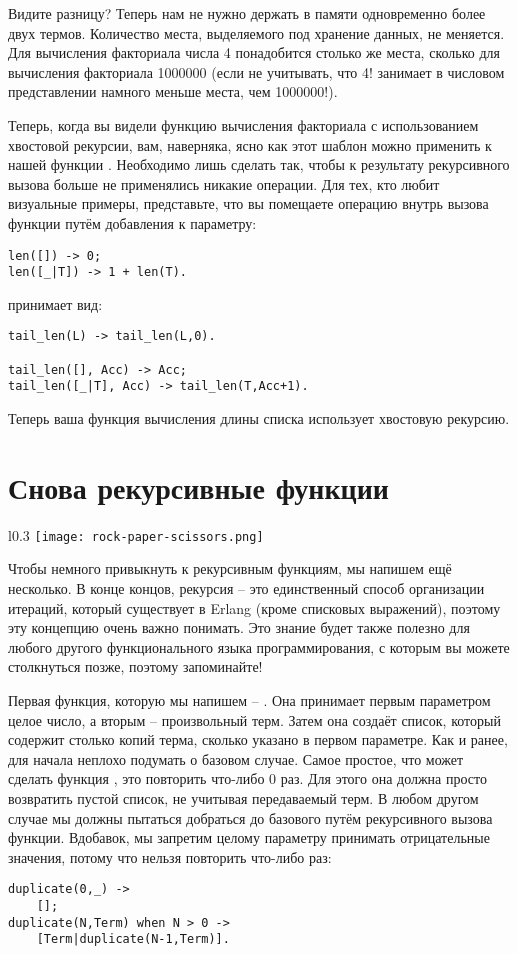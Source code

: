 Видите разницу? Теперь нам не нужно держать в памяти одновременно более двух термов. Количество места, выделяемого под хранение данных, не меняется. Для вычисления факториала числа 4 понадобится столько же места, сколько для вычисления факториала 1000000 (если не учитывать, что 4! занимает в числовом представлении намного меньше места, чем 1000000!).

Теперь, когда вы видели функцию вычисления факториала с использованием хвостовой рекурсии, вам, наверняка, ясно как этот шаблон можно применить к нашей функции . Необходимо лишь сделать так, чтобы к результату рекурсивного вызова больше не применялись никакие операции. Для тех, кто любит визуальные примеры, представьте, что вы помещаете операцию  внутрь вызова функции путём добавления к параметру:
\begin{lstlisting}[style=erlang]
len([]) -> 0;
len([_|T]) -> 1 + len(T).
\end{lstlisting}
принимает вид:
\begin{lstlisting}[style=erlang]
tail_len(L) -> tail_len(L,0).
 
tail_len([], Acc) -> Acc;
tail_len([_|T], Acc) -> tail_len(T,Acc+1).
\end{lstlisting}

Теперь ваша функция вычисления длины списка использует хвостовую рекурсию.
\section{Снова рекурсивные функции}
\begin{wrapfigure}{l}{0.3\linewidth}
    \texttt{[image: rock-paper-scissors.png]}
\end{wrapfigure}
Чтобы немного привыкнуть к рекурсивным функциям, мы напишем ещё несколько. В конце концов, рекурсия \--- это единственный способ организации итераций, который существует в Erlang (кроме списковых выражений), поэтому эту концепцию очень важно понимать. Это знание будет также полезно для любого другого функционального языка программирования, с которым вы можете столкнуться позже, поэтому запоминайте!

Первая функция, которую мы напишем \--- . Она принимает первым параметром целое число, а вторым \--- произвольный терм. Затем она создаёт список, который содержит столько копий терма, сколько указано в первом параметре. Как и ранее, для начала неплохо подумать о базовом случае. Самое простое, что может сделать функция , это повторить что\--либо 0 раз. Для этого она должна просто возвратить пустой список, не учитывая передаваемый терм. В любом другом случае мы должны пытаться добраться до базового путём рекурсивного вызова функции. Вдобавок, мы запретим целому параметру принимать отрицательные значения, потому что нельзя повторить что\--либо  раз:
\begin{lstlisting}[style=erlang]
duplicate(0,_) ->
    [];
duplicate(N,Term) when N > 0 ->
    [Term|duplicate(N-1,Term)].
\end{lstlisting}

